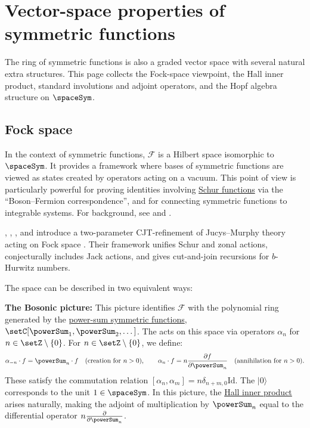 

\section[symmetricFunctionsSpace]{Vector-space properties of symmetric functions}

The ring of symmetric functions is also a graded vector space with several
natural extra structures.  This page collects the Fock-space viewpoint, the
Hall inner product, standard involutions and adjoint operators, and the Hopf
algebra structure on $\spaceSym$.


\subsection[fockSpace]{Fock space}

In the context of symmetric functions,  $\mathcal{F}$ is a
Hilbert space isomorphic to $\spaceSym$.
It provides a framework where bases of symmetric functions are viewed as states
created by operators acting on a vacuum.
This point of view is particularly powerful for proving identities involving
\hyperref[schurS]{Schur functions} via the \enquote{Boson--Fermion
correspondence}, and for connecting symmetric functions to integrable systems.
For background, see \cite[Chap.~14]{Kac1990} and
\cite[Chap.~4]{MiwaJimboDateReid2000}.

, ,
, and  introduce a two-parameter
CJT-refinement of Jucys--Murphy theory acting on Fock space
\cite{FeslerHahnKarevMarkwig2025x}.  Their framework unifies Schur and zonal
actions, conjecturally includes Jack actions, and gives cut-and-join
recursions for $b$-Hurwitz numbers.

The space can be described in two equivalent ways:

\textbf{The Bosonic picture:} This picture identifies $\mathcal{F}$ with the
polynomial ring generated by the \hyperref[powerSum]{power-sum symmetric functions},
$\setC[\powerSum_1, \powerSum_2, \dotsc]$.
The  acts on this space via operators $\alpha_n$ for
$n \in \setZ \setminus \{0\}$.
For $n \in \setZ \setminus \{0\}$, we define:
\[
\alpha_{-n} \cdot f = \powerSum_n \cdot f
\quad \text{(creation for $n > 0$)}, \qquad
\alpha_{n} \cdot f = n \frac{\partial f}{\partial \powerSum_n}
\quad \text{(annihilation for $n > 0$)}.
\]
These satisfy the commutation relation
$[\alpha_n, \alpha_m] = n \delta_{n+m,0} \mathrm{Id}$.
The  $|0\rangle$ corresponds to the unit $1 \in \spaceSym$.
In this picture, the \hyperref[hallInnerProduct]{Hall inner product} arises
naturally, making the adjoint of multiplication by $\powerSum_n$ equal to
the differential operator $n \frac{\partial}{\partial \powerSum_n}$.



